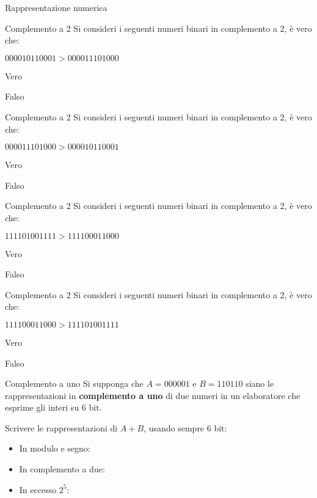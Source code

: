\documentclass[11pt]{article}
\begin{document}
\begin{quiz}{Rappresentazione numerica}
\begin{multi}[points=1]{Complemento a 2}
Si consideri i seguenti numeri binari in complemento a 2, \`{e} vero che:

$000010110001 > 000011101000$

\item Vero
\item* Falso
\end{multi}

\begin{multi}[points=1]{Complemento a 2}
Si consideri i seguenti numeri binari in complemento a 2, \`{e} vero che:

$000011101000 > 000010110001$

\item* Vero
\item Falso
\end{multi}

\begin{multi}[points=1]{Complemento a 2}
Si consideri i seguenti numeri binari in complemento a 2, \`{e} vero che:

$111101001111 > 111100011000$

\item* Vero
\item Falso
\end{multi}

\begin{multi}[points=1]{Complemento a 2}
Si consideri i seguenti numeri binari in complemento a 2, \`{e} vero che:

$111100011000 > 111101001111$

\item Vero
\item* Falso
\end{multi}



\begin{cloze}[points=1,shuffle=false]{Complemento a uno}
Si supponga che $A = 000001$ e $B = 110110$ siano le rappresentazioni in \textbf{complemento a uno} di due numeri in un elaboratore che esprime gli interi su 6 bit.

Scrivere le rappresentazioni di $A+B$, usando sempre 6 bit:

\begin{itemize}
\item In modulo e segno: 
\item In complemento a due: 
\item In eccesso $2^5$: 
\end{itemize}
\end{cloze}


\end{quiz}
\end{document}

